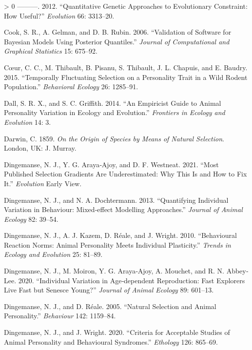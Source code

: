 \documentclass{article}
\newlength{\cslhangindent}
\newenvironment{CSLReferences}[3] %
 {%
  \setlength{\parindent}{0pt}
  \ifodd #1 \everypar{\setlength{\hangindent}{\cslhangindent}}\ignorespaces\fi
  \ifnum #2 > 0
  \setlength{\parskip}{#2\baselineskip}
  \fi
 }%
 {}
\begin{document}
\begin{CSLReferences}{1}{0}
\leavevmode\hypertarget{ref-Conner2012}{}%
---------. 2012. {``Quantitative Genetic Approaches to Evolutionary
Constraint: How Useful?''} \emph{Evolution} 66: 3313--20.

\leavevmode\hypertarget{ref-Cook2006}{}%
Cook, S. R., A. Gelman, and D. B. Rubin. 2006. {``Validation of Software
for Bayesian Models Using Posterior Quantiles.''} \emph{Journal of
Computational and Graphical Statistics} 15: 675--92.

\leavevmode\hypertarget{ref-LC2015}{}%
Cœur, C. C., M. Thibault, B. Pisanu, S. Thibault, J. L. Chapuis, and E.
Baudry. 2015. {``Temporally Fluctuating Selection on a Personality Trait
in a Wild Rodent Population.''} \emph{Behavioral Ecology} 26: 1285--91.

\leavevmode\hypertarget{ref-Dall2014}{}%
Dall, S. R. X., and S. C. Griffith. 2014. {``An Empiricist Guide to
Animal Personality Variation in Ecology and Evolution.''}
\emph{Frontiers in Ecology and Evolution} 14: 3.

\leavevmode\hypertarget{ref-Darwin}{}%
Darwin, C. 1859. \emph{On the Origin of Species by Means of Natural
Selection}. London, UK: J. Murray.

\leavevmode\hypertarget{ref-Ding2021}{}%
Dingemanse, N. J., Y. G. Araya‐Ajoy, and D. F. Westneat. 2021. {``Most
Published Selection Gradients Are Underestimated: Why This Is and How to
Fix It.''} \emph{Evolution} Early View.

\leavevmode\hypertarget{ref-DingDocht2013}{}%
Dingemanse, N. J., and N. A. Dochtermann. 2013. {``Quantifying
Individual Variation in Behaviour: Mixed‐effect Modelling Approaches.''}
\emph{Journal of Animal Ecology} 82: 39--54.

\leavevmode\hypertarget{ref-Ding2010}{}%
Dingemanse, N. J., A. J. Kazem, D. Réale, and J. Wright. 2010.
{``Behavioural Reaction Norms: Animal Personality Meets Individual
Plasticity.''} \emph{Trends in Ecology and Evolution} 25: 81--89.

\leavevmode\hypertarget{ref-Ding2020b}{}%
Dingemanse, N. J., M. Moiron, Y. G. Araya‐Ajoy, A. Mouchet, and R. N.
Abbey‐Lee. 2020. {``Individual Variation in Age‐dependent Reproduction:
Fast Explorers Live Fast but Senesce Young?''} \emph{Journal of Animal
Ecology} 89: 601--13.

\leavevmode\hypertarget{ref-Ding2005}{}%
Dingemanse, N. J., and D. Réale. 2005. {``Natural Selection and Animal
Personality.''} \emph{Behaviour} 142: 1159--84.

\leavevmode\hypertarget{ref-Ding2020}{}%
Dingemanse, N. J., and J. Wright. 2020. {``Criteria for Acceptable
Studies of Animal Personality and Behavioural Syndromes.''}
\emph{Ethology} 126: 865--69.


\end{CSLReferences}
\end{document}
